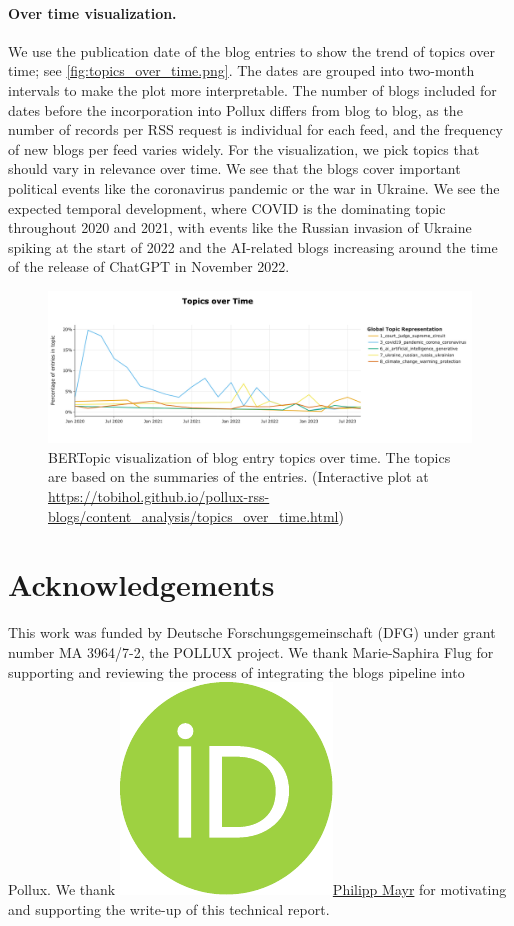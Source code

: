 \documentclass{article}
\begin{document}
\paragraph{Over time visualization.}
We use the publication date of the blog entries to show the trend of topics over time; see \autoref{fig:topics_over_time.png}. The dates are grouped into two-month intervals to make the plot more interpretable. The number of blogs included for dates before the incorporation into Pollux differs from blog to blog, as the number of records per RSS request is individual for each feed, and the frequency of new blogs per feed varies widely. For the visualization, we pick topics that should vary in relevance over time. We see that the blogs cover important political events like the coronavirus pandemic or the war in Ukraine. We see the expected temporal development, where COVID is the dominating topic throughout 2020 and 2021, with events like the Russian invasion of Ukraine spiking at the start of 2022 and the AI-related blogs increasing around the time of the release of ChatGPT in November 2022.

\begin{figure}[!htb]
    \includegraphics[width=1.0\textwidth]{figures/topics_over_time.png}
    \caption{BERTopic visualization of blog entry topics over time. The topics are based on the summaries of the entries. (Interactive plot at \url{https://tobihol.github.io/pollux-rss-blogs/content_analysis/topics_over_time.html})}
    \label{fig:topics_over_time.png}
\end{figure}

\section*{Acknowledgements}
This work was funded by Deutsche Forschungsgemeinschaft (DFG) under grant number MA 3964/7-2, the POLLUX project.
We thank Marie-Saphira Flug for supporting and reviewing the process of integrating the blogs pipeline into Pollux.
We thank \href{https://orcid.org/0000-0002-6656-1658}{\includegraphics[scale=0.06]{orcid.pdf}Philipp Mayr} for motivating and supporting the write-up of this technical report.
\printbibliography
\end{document}
